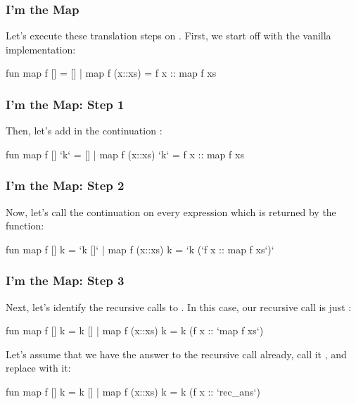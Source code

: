\documentclass[aspectratio=169]{beamer}
\begin{document}
\begin{frame}[fragile]
  \frametitle{I'm the Map}

  Let's execute these translation steps on . First, we start off with
  the vanilla implementation:

  \begin{codeblock}
    fun map f []      = []
      | map f (x::xs) =
          f x :: map f xs
  \end{codeblock}
\end{frame}

\begin{frame}[fragile]
  \frametitle{I'm the Map: Step 1}

  Then, let's add in the continuation :

  \begin{codeblock}
    fun map f [] `k`      = []
      | map f (x::xs) `k` =
          f x :: map f xs
  \end{codeblock}
\end{frame}

\begin{frame}[fragile]
  \frametitle{I'm the Map: Step 2}

  Now, let's call the continuation  on every expression which
  is returned by the function:

  \begin{codeblock}
    fun map f [] k      = `k []`
      | map f (x::xs) k =
          `k (`f x :: map f xs`)`
  \end{codeblock}
\end{frame}

\begin{frame}[fragile]
  \frametitle{I'm the Map: Step 3}

  Next, let's identify the recursive calls to . In this case,
  our recursive call  is just :

  \begin{codeblock}
    fun map f [] k      = k []
      | map f (x::xs) k =
          k (f x :: `map f xs`)
  \end{codeblock}

  \pause
  \vspace{\fill}

  Let's assume that we have the answer to the recursive call already, call it
  , and replace  with it:

  \begin{codeblock}
    fun map f [] k      = k []
      | map f (x::xs) k =
          k (f x :: `rec_ans`)
  \end{codeblock}
\end{frame}
\end{document}

